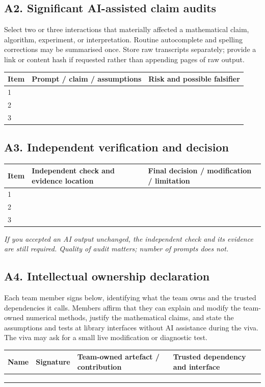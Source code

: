 \documentclass[11pt]{article}
\begin{document}
\subsection*{A2. Significant AI-assisted claim audits}
Select two or three interactions that materially affected a mathematical claim,
algorithm, experiment, or interpretation. Routine autocomplete and spelling
corrections may be summarised once. Store raw transcripts separately; provide a
link or content hash if requested rather than appending pages of raw output.
\begin{table}[h]
\centering
\small
\begin{tabular}{@{}p{0.8cm}p{5.7cm}p{5.0cm}@{}}
\toprule
Item & Prompt / claim / assumptions & Risk and possible falsifier \\
\midrule
1 & & \\
2 & & \\
3 & & \\
\bottomrule
\end{tabular}
\end{table}

\subsection*{A3. Independent verification and decision}
\begin{table}[h]
\centering
\small
\begin{tabular}{@{}p{0.8cm}p{5.7cm}p{5.0cm}@{}}
\toprule
Item & Independent check and evidence location & Final decision / modification / limitation \\
\midrule
1 & & \\
2 & & \\
3 & & \\
\bottomrule
\end{tabular}
\end{table}
\emph{If you accepted an AI output unchanged, the independent check and its
evidence are still required. Quality of audit matters; number of prompts does not.}

\subsection*{A4. Intellectual ownership declaration}
Each team member signs below, identifying what the team owns and the trusted
dependencies it calls. Members affirm that they can explain and modify the
team-owned numerical methods, justify the mathematical claims, and state the
assumptions and tests at library interfaces without AI assistance during the
viva. The viva may ask for a small live modification or diagnostic test.
\begin{table}[h]
\centering
\small
\begin{tabular}{@{}p{2.4cm}p{2.4cm}p{4.0cm}p{3.2cm}@{}}
\toprule
Name & Signature & Team-owned artefact / contribution & Trusted dependency and interface \\
\midrule
 & & \\
 & & \\
 & & \\
\bottomrule
\end{tabular}
\end{table}
\end{document}
